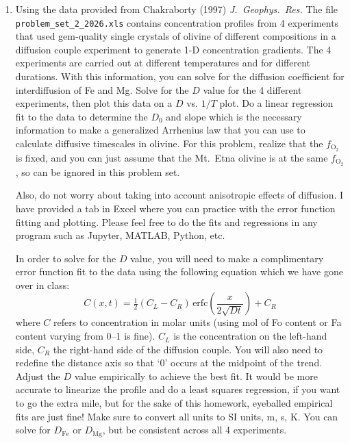 \documentclass{template}
\begin{document}
\begin{enumerate}[label=\textbf{\arabic*.}]
\begin{enumerate}[label=\textit{Part \arabic*:}, leftmargin=*]
\item Using the data provided from Chakraborty (1997) \textit{J.\ Geophys.\ Res.} The file \\\texttt{problem\_set\_2\_2026.xls} contains concentration profiles from 4 experiments that used gem-quality single crystals of olivine of different compositions in a diffusion couple experiment to generate 1-D concentration gradients. The 4 experiments are carried out at different temperatures and for different durations. With this information, you can solve for the diffusion coefficient for interdiffusion of Fe and Mg. Solve for the $D$ value for the 4 different experiments, then plot this data on a $D$ vs. $1/T$ plot. Do a linear regression fit to the data to determine the $D_0$ and slope which is the necessary information to make a generalized Arrhenius law that you can use to calculate diffusive timescales in olivine. For this problem, realize that the $f_{\mathrm{O}_2}$ is fixed, and you can just assume that the Mt.\ Etna olivine is at the same $f_{\mathrm{O}_2}$, so can be ignored in this problem set.

Also, do not worry about taking into account anisotropic effects of diffusion. I have provided a tab in Excel where you can practice with the error function fitting and plotting. Please feel free to do the fits and regressions in any program such as Jupyter, MATLAB, Python, etc.

In order to solve for the $D$ value, you will need to make a complimentary error function fit to the data using the following equation which we have gone over in class:
\[
C(x,t) = \tfrac{1}{2}\left(C_L - C_R\right)\,\mathrm{erfc}\!\left(\frac{x}{2\sqrt{Dt}}\right) + C_R
\]
where $C$ refers to concentration in molar units (using mol of Fo content or Fa content varying from 0--1 is fine). $C_L$ is the concentration on the left-hand side, $C_R$ the right-hand side of the diffusion couple. You will also need to redefine the distance axis so that `0' occurs at the midpoint of the trend. Adjust the $D$ value empirically to achieve the best fit. It would be more accurate to linearize the profile and do a least squares regression, if you want to go the extra mile, but for the sake of this homework, eyeballed empirical fits are just fine! Make sure to convert all units to SI units, m, s, K. You can solve for $D_{\mathrm{Fe}}$ or $D_{\mathrm{Mg}}$, but be consistent across all 4 experiments.


\end{enumerate}
\end{enumerate}
\end{document}
